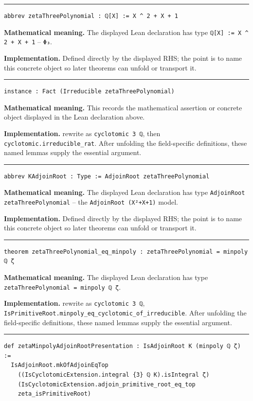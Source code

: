 \documentclass[UTF8,a4paper,11pt,fontset=fandol]{ctexart}
\theoremstyle{definition}
\newcommand{\statementsep}{\par\medskip\hrule\medskip}
\begin{document}
\statementsep
\begin{verbatim}
abbrev zetaThreePolynomial : ℚ[X] := X ^ 2 + X + 1
\end{verbatim}
\noindent\textbf{Mathematical meaning.} The displayed Lean declaration has type \texttt{ℚ[X] := X \textasciicircum{} 2 + X + 1} -- \texttt{Φ₃}.\par
\noindent\textbf{Implementation.} Defined directly by the displayed RHS; the point is to name this concrete object so later theorems can unfold or transport it.\par
\statementsep
\begin{verbatim}
instance : Fact (Irreducible zetaThreePolynomial)
\end{verbatim}
\noindent\textbf{Mathematical meaning.} This records the mathematical assertion or concrete object displayed in the Lean declaration above.\par
\noindent\textbf{Implementation.} rewrite as \texttt{cyclotomic 3 ℚ}, then \texttt{cyclotomic.\allowbreak{}irreducible\_\allowbreak{}rat}. After unfolding the field-specific definitions, these named lemmas supply the essential argument.\par
\statementsep
\begin{verbatim}
abbrev KAdjoinRoot : Type := AdjoinRoot zetaThreePolynomial
\end{verbatim}
\noindent\textbf{Mathematical meaning.} The displayed Lean declaration has type \texttt{AdjoinRoot zetaThreePolynomial} -- the \texttt{AdjoinRoot (X²+X+1)} model.\par
\noindent\textbf{Implementation.} Defined directly by the displayed RHS; the point is to name this concrete object so later theorems can unfold or transport it.\par
\statementsep
\begin{verbatim}
theorem zetaThreePolynomial_eq_minpoly : zetaThreePolynomial = minpoly ℚ ζ
\end{verbatim}
\noindent\textbf{Mathematical meaning.} The displayed Lean declaration has type \texttt{zetaThreePolynomial = minpoly ℚ ζ}.\par
\noindent\textbf{Implementation.} rewrite as \texttt{cyclotomic 3 ℚ}, \texttt{IsPrimitiveRoot.\allowbreak{}minpoly\_\allowbreak{}eq\_\allowbreak{}cyclotomic\_\allowbreak{}of\_\allowbreak{}irreducible}. After unfolding the field-specific definitions, these named lemmas supply the essential argument.\par
\statementsep
\begin{verbatim}
def zetaMinpolyAdjoinRootPresentation : IsAdjoinRoot K (minpoly ℚ ζ) :=
  IsAdjoinRoot.mkOfAdjoinEqTop
    ((IsCyclotomicExtension.integral {3} ℚ K).isIntegral ζ)
    (IsCyclotomicExtension.adjoin_primitive_root_eq_top
    zeta_isPrimitiveRoot)
\end{verbatim}
\end{document}

